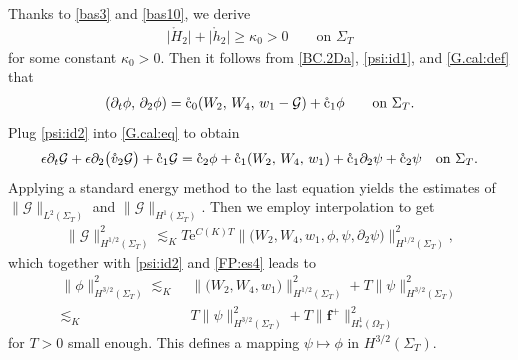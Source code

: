 \documentclass[twoside,11pt]{article}
\numberwithin{equation}{section}
\def\p{\partial}
\begin{document}
Thanks to \eqref{bas3} and \eqref{bas10}, we derive
\begin{align} \label{noncol2}
	\big|\mathring{H}_2\big|+\big|\mathring{h}_2\big|\geq \kappa_0 >0 \qquad \textrm{on }\Sigma_T
\end{align}
for some constant $\kappa_0>0$. Then it follows from \eqref{BC.2Da}, \eqref{psi:id1}, and \eqref{G.cal:def} that
\begin{align}
	(\p_t\phi,\, \p_2\phi)
	=\mathring{\rm c}_0 (W_2,\, W_4,\, w_1-\mathcal{G})
	+\mathring{\rm c}_1 \phi
	\qquad \textrm{on }\Sigma_T.
	\label{psi:id2}
\end{align}
Plug \eqref{psi:id2} into \eqref{G.cal:eq} to obtain
\begin{align*}
	\epsilon\p_t \mathcal{G}+\epsilon\p_2\big(\mathring{v}_2 \mathcal{G} \big)
	+\mathring{\rm c}_1 \mathcal{G}
	=\mathring{\rm c}_2\phi+
	\mathring{\rm c}_1(W_2,\, W_4,\, w_1)
	+\mathring{\rm c}_1\p_2\psi+\mathring{\rm c}_2\psi
	\quad \textrm{on }\Sigma_T.
\end{align*}
Applying a standard energy method to the last equation yields the estimates of $\|\mathcal{G} \big\|_{L^{2}(\Sigma_T)}$ and $\|\mathcal{G} \big\|_{H^{1}(\Sigma_T)}$.
Then we employ interpolation to get
\begin{align}
	\big\|\mathcal{G} \big\|_{H^{1/2}(\Sigma_T)}^2
	\lesssim_K	
	T \mathrm{e}^{C(K)T} \big\|\big(W_2, W_4, w_1,  \phi,  \psi,   \p_2 \psi\big)\big\|_{H^{1/2}(\Sigma_T)}^2,
	\nonumber
\end{align}
which together with \eqref{psi:id2} and \eqref{FP:es4} leads to
\begin{align}
	\| \phi\|_{H^{3/2}(\Sigma_T)}^2
	\lesssim_K	\; &
	\big\|\big(W_2, W_4,  w_1 \big)\big\|_{H^{1/2}(\Sigma_T)}^2
	+T \big\|\psi \big\|_{H^{3/2}(\Sigma_T)}^2	
	\nonumber\\[0.5mm]
	\lesssim_K	\; &
	T\|  {\psi} \|_{H^{3/2}(\Sigma_T)}^2+  T {\|} \bm{f}^+ {\|}_{H_*^1(\Omega_T)}^2
	\label{FP:es5}
\end{align}
for $T>0$ small enough.
This defines a mapping ${\psi}\mapsto \phi$ in $H^{3/2}(\Sigma_T)$.
\end{document}
